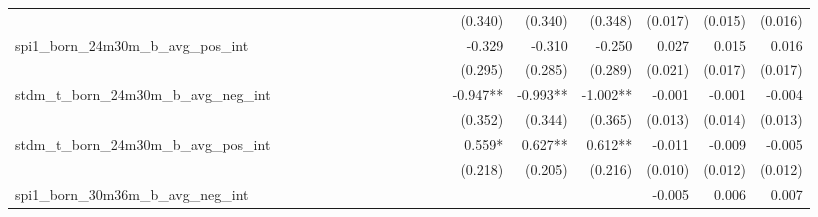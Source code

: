 \begin{tabular}{lrrrrrrrrrrrrrrrrrr}
                                            &              &              &              &              &              &              &              &              &               &              &              &               &      (0.340) &      (0.340) &       (0.348) &      (0.017) &      (0.015) &       (0.016) \\ 
spi1\_born\_24m30m\_b\_avg\_pos\_int        &              &              &              &              &              &              &              &              &               &              &              &               &       -0.329 &       -0.310 &        -0.250 &        0.027 &        0.015 &         0.016 \\ 
                                            &              &              &              &              &              &              &              &              &               &              &              &               &      (0.295) &      (0.285) &       (0.289) &      (0.021) &      (0.017) &       (0.017) \\ 
stdm\_t\_born\_24m30m\_b\_avg\_neg\_int     &              &              &              &              &              &              &              &              &               &              &              &               &     -0.947** &     -0.993** &      -1.002** &       -0.001 &       -0.001 &        -0.004 \\ 
                                            &              &              &              &              &              &              &              &              &               &              &              &               &      (0.352) &      (0.344) &       (0.365) &      (0.013) &      (0.014) &       (0.013) \\ 
stdm\_t\_born\_24m30m\_b\_avg\_pos\_int     &              &              &              &              &              &              &              &              &               &              &              &               &       0.559* &      0.627** &       0.612** &       -0.011 &       -0.009 &        -0.005 \\ 
                                            &              &              &              &              &              &              &              &              &               &              &              &               &      (0.218) &      (0.205) &       (0.216) &      (0.010) &      (0.012) &       (0.012) \\ 
spi1\_born\_30m36m\_b\_avg\_neg\_int        &              &              &              &              &              &              &              &              &               &              &              &               &              &              &               &       -0.005 &        0.006 &         0.007 \\ 

\end{tabular}
